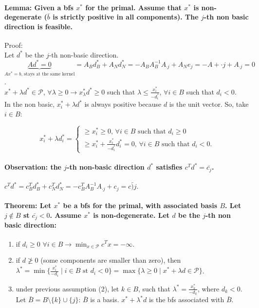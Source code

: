 \documentclass[main]{subfiles}
\begin{document}
\paragraph{Lemma: Given a bfs $x^*$ for the primal. Assume that $x^*$ is
non-degenerate ($\bar{b}$ is strictly positive in all components).
The $j$-th non basic direction is feasible.}

Proof:\\
Let $d^*$ be the $j$-th non-basic direction. $\underbrace{Ad^* = 0}_{Ax^* = b
\text{, stays at the same kernel}} = A_B d^*_B + A_N d^*_N =
-A_B A^{-1}_B A_{\cdot j} + A_N e_j = -A+{\cdot j} + A_{\cdot j } = 0$.\\

$x^* + \lambda d^* \in \mathcal{P}$, $\forall \lambda \geq 0 \rightarrow
x^*_ \lambda d^* \geq 0$ such that $\lambda \leq \frac{x^*_i}{-d^*_i}$,
$\forall i \in B$ such that $d_i < 0$.\\

In the non basic,  $x^*_i + \lambda d^*$ is always positive because $d$ is the
unit vector. So, take $i \in B$:

\[
  x^*_i + \lambda d^*_i =
  \left\{
	\begin{array}{ll}
    \geq x^*_i \geq 0 \text{, }\forall i \in B \text{ such that }d_i \geq 0\\
	\geq x^*_i + \frac{x^*_i}{-d^*_i} d^*_i = 0 \text{, } \forall i \in B
	\text{ such that } d_i < 0.
    \end{array}
  \right.
\]

\paragraph{Observation: the $j$-th non-basic direction $d^*$ satisfies
$c^T d^* = \bar{c_j}$.}

$c^T d^* = c^T_B d^*_B + c^T_N d^*_N = -c^T_B A^{-1}_B A_{\cdot j} + c_j =
\bar{c)j}$.

\paragraph{Theorem: Let $x^*$ be a bfs for the primal, with associated basis
$B$. Let $j \notin B$ st $\bar{c_j} < 0$. Assume $x^*$ is non-degenerate.
Let $d$ be the $j$-th non basic direction:}
\begin{enumerate}
\item if $d_i \geq 0$ $\forall i \in B \rightarrow \displaystyle \min_{x
\in \mathcal{P}} c^{T} x = -\infty$.
\item if $d \ngeq 0$ (some components are smaller than zero),
then $\lambda^* = \min \{\frac{x^*_i}{-d_i} \mid i \in B \text{ st } d_i < 0 \}
= \max \{\lambda \geq 0 \mid x^* + \lambda d \in \mathcal{P} \}$.
\item under previous assumption (2), let $k \in B$, such that
$\lambda^* = \frac{x^*_k}{-d_k}$, where $d_k < 0$. Let $\bar{B} =
B\setminus \{ k\} \cup \{j\}$:
\subitem $\bar{B}$ is a basis.
\subitem $x^* + \lambda^* d $ is the bfs associated with $\bar{B}$.
\end{enumerate}
\end{document}
